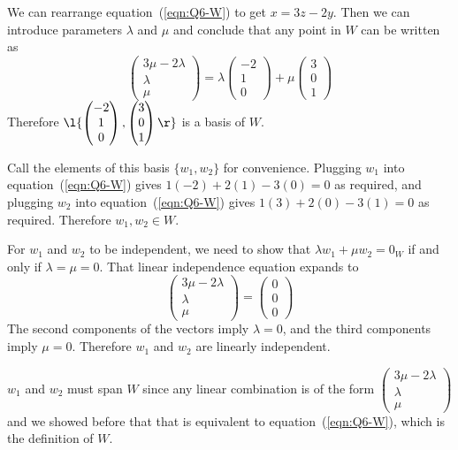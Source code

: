 \documentclass[a4paper]{article}
\begin{document}
We can rearrange equation~(\ref{eqn:Q6-W}) to get $x = 3z - 2y$. Then we can introduce parameters $\lambda$ and $\mu$ and conclude that any point in $W$ can be written as $$\begin{pmatrix}3 \mu - 2 \lambda\\ \lambda\\ \mu\end{pmatrix} = \lambda \begin{pmatrix}-2\\ 1\\ 0\end{pmatrix} + \mu \begin{pmatrix}3\\ 0\\ 1\end{pmatrix}$$
Therefore $\l\{ \begin{pmatrix}- 2\\ 1\\ 0\end{pmatrix}, \begin{pmatrix}3\\ 0\\ 1\end{pmatrix} \r\}$ is a basis of $W$.

Call the elements of this basis $\{ w_1, w_2 \}$ for convenience. Plugging $w_1$ into equation~(\ref{eqn:Q6-W}) gives $1(-2) + 2(1)  - 3(0) = 0$ as required, and plugging $w_2$ into equation~(\ref{eqn:Q6-W}) gives $1(3) + 2(0) - 3(1) = 0$ as required. Therefore $w_1, w_2 \in W$.

For $w_1$ and $w_2$ to be independent, we need to show that $\lambda w_1 + \mu w_2 = 0_W$ if and only if $\lambda = \mu = 0$. That linear independence equation expands to $$\begin{pmatrix}3 \mu - 2 \lambda\\ \lambda\\ \mu\end{pmatrix} = \begin{pmatrix}0\\ 0\\ 0\end{pmatrix}$$
The second components of the vectors imply $\lambda = 0$, and the third components imply $\mu = 0$. Therefore $w_1$ and $w_2$ are linearly independent.

$w_1$ and $w_2$ must span $W$ since any linear combination is of the form $\begin{pmatrix}3 \mu - 2 \lambda\\ \lambda\\ \mu\end{pmatrix}$ and we showed before that that is equivalent to equation~(\ref{eqn:Q6-W}), which is the definition of $W$.
\end{document}
